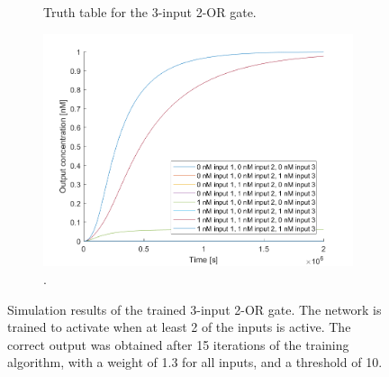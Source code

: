 \begin{figure}[H]
\begin{subfigure}[t]{.49\columnwidth}
\begin{tabular}[b]{cccc}
    \hline
    \end{tabular}
    \caption{Truth table for the 3-input 2-OR gate.}
    \label{and_table}
\end{subfigure}
\hfill
\begin{subfigure}[t]{.49\columnwidth}
  \centering
\includegraphics[width=\linewidth]{images/or_2_simulation_3input.png}
\caption{.}
\label{}
\end{subfigure}
\caption{Simulation results of the trained 3-input 2-OR gate. The network is trained to activate when at least 2 of the inputs is active. The correct output was obtained after 15 iterations of the training algorithm, with a weight of 1.3 for all inputs, and a threshold of 10.}
\end{figure}
